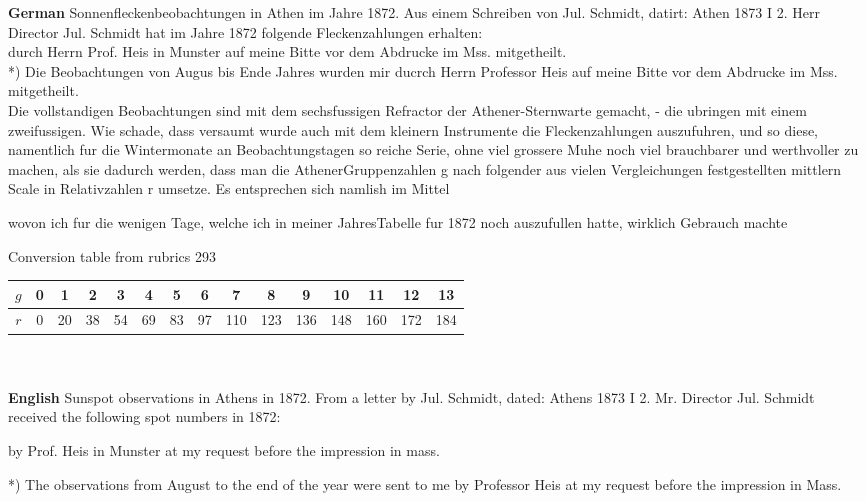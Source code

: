 \documentclass[12pt]{article}
\begin{document}
\textbf{German}
Sonnenfleckenbeobachtungen in Athen im Jahre 1872. Aus einem Schreiben von Jul. Schmidt, datirt: Athen 1873 I 2.
Herr Director Jul. Schmidt hat im Jahre 1872 folgende Fleckenzahlungen erhalten:\\

durch Herrn Prof. Heis in Munster auf meine Bitte vor dem Abdrucke im Mss. mitgetheilt.\\

*) Die Beobachtungen von Augus bis Ende Jahres wurden mir ducrch Herrn Professor Heis auf meine Bitte vor dem Abdrucke im Mss. mitgetheilt. \\

Die vollstandigen Beobachtungen sind mit dem sechsfussigen Refractor der Athener-Sternwarte gemacht, - die ubringen mit einem zweifussigen. Wie schade, dass versaumt wurde auch mit dem kleinern Instrumente die Fleckenzahlungen auszufuhren, und so diese, namentlich fur die Wintermonate an Beobachtungstagen so reiche Serie, ohne viel grossere Muhe noch viel brauchbarer und werthvoller zu machen, als sie dadurch werden, dass man die AthenerGruppenzahlen g nach folgender aus vielen Vergleichungen festgestellten mittlern Scale in Relativzahlen r umsetze. Es entsprechen sich namlish im Mittel

wovon ich fur die wenigen Tage, welche ich in meiner JahresTabelle fur 1872 noch auszufullen hatte, wirklich Gebrauch machte\\

{\centering
    \caption{Conversion table from rubrics 293}
    \begin{tabular}{c|c c c c c c c c c c c c c c }
        $g$ & 0 & 1 & 2 & 3 & 4 & 5 & 6 & 7 & 8 & 9 & 10 & 11 & 12 & 13 \\
        \hline
        $r$ & 0 & 20 & 38 & 54 & 69 & 83 & 97 & 110 & 123 & 136 & 148 & 160 & 172 & 184
    \end{tabular}
    
    \label{table:silly table version 2}
\par}\\

\\ 

\textbf{English}
Sunspot observations in Athens in 1872. From a letter by Jul. Schmidt, dated: Athens 1873 I 2.
Mr. Director Jul. Schmidt received the following spot numbers in 1872:

by Prof. Heis in Munster at my request before the impression in mass.

*) The observations from August to the end of the year were sent to me by Professor Heis at my request before the impression in Mass. 
\end{document}

